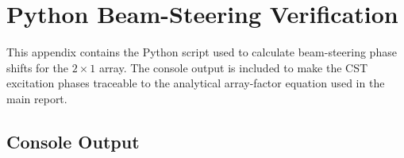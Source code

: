 \chapter{Python Beam-Steering Verification}
\label{app:beamsteering-verification}

This appendix contains the Python script used to calculate beam-steering phase shifts for the
\(2\times1\) array. The console output is included to make the CST excitation phases traceable to the
analytical array-factor equation used in the main report.



\section{Console Output}
\label{appsec:beamsteering-console-output}


